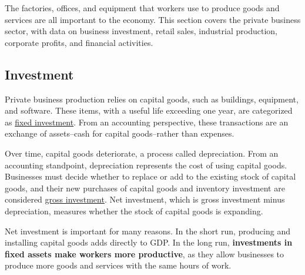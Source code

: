\begin{minipage}{0.76\textwidth}  
\small The factories, offices, and equipment that workers use to produce goods and services are all important to the economy. This section covers the private business sector, with data on business investment, retail sales, industrial production, corporate profits, and financial activities. 

\subsection*{Investment}
\hypertarget{busin}{\label{busin}}
 
\small Private business production relies on capital goods, such as buildings, equipment, and software. These items, with a useful life exceeding one year, are categorized as \href{https://www.bea.gov/help/glossary/nonresidential-fixed-investment}{fixed investment}. From an accounting perspective, these transactions are an exchange of assets--cash for capital goods--rather than expenses.

Over time, capital goods deteriorate, a process called depreciation. From an accounting standpoint, depreciation represents the cost of using capital goods. Businesses must decide whether to replace or add to the existing stock of capital goods, and their new purchases of capital goods and inventory investment are considered \href{https://www.bea.gov/help/glossary/gross-private-domestic-investment}{gross investment}. Net investment, which is gross investment minus depreciation, measures whether the stock of capital goods is expanding.

Net investment is important for many reasons. In the short run, producing and installing capital goods adds directly to GDP. In the long run, \textbf{investments in fixed assets make workers more productive}, as they allow businesses to produce more goods and services with the same hours of work. 
\end{minipage}
\vspace{1mm}

